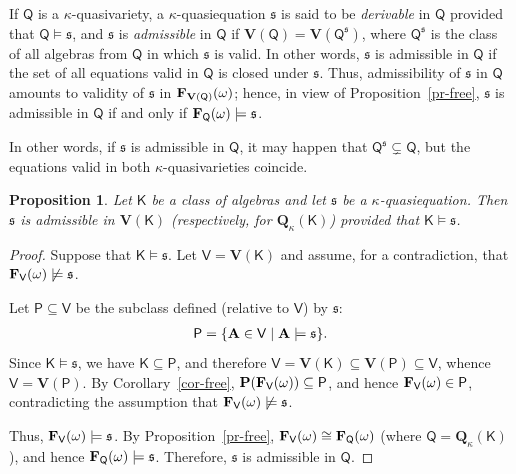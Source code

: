 \documentclass[submission,copyright,creativecommons]{eptcs}
\newtheorem{prop}[theorem]{Proposition}
\theoremstyle{definition}
\newcommand{\alg}[1]{{{\textbf{\upshape #1}}}}
\newcommand{\VV}{\mathbf{V}}
\newcommand{\QQ}{\mathbf{Q}}
\newcommand{\PR}{\mathbf{P}}
\newcommand{\vv}[1]{\mathsf {#1}}
\newcommand{\FrV}{\alg F_\vv V(\omega)}
\newcommand{\Def}[1]{\textit{#1}}
\newcommand{\seq}[2]{#1 \Ra  {#2}}
\newcommand{\GG}{\Gamma}
\newcommand{\gm}{\gamma}
\newcommand{\kk}{\kappa}
\newcommand{\Ra}{\Rightarrow}
\newcommand{\sq}{\mathfrak{s}}
\begin{document}
If $\vv Q$ is a $\kk$-quasivariety, a $\kk$-quasiequation $\sq$ is said to be \Def{derivable} in $\vv Q$ provided that $\vv Q \models \sq$, and $\sq$ is \Def{admissible} in $\vv Q$ if $\VV(\vv Q) = \VV(\vv Q^\sq)$, where $\vv Q^\sq$ is the class of all algebras from $\vv Q$ in which $\sq$ is valid. In other words, $\sq$ is admissible in $\vv Q$ if the set of all equations valid in $\vv Q$ is closed under $\sq$. Thus, admissibility of $\sq$ in $\vv Q$ amounts to validity of $\sq$ in $\alg F_{\VV(\vv Q)}(\omega)$; hence, in view of Proposition~\ref{pr-free}, $\sq$ is admissible in $\vv Q$ if and only if $\alg F_\vv Q(\omega) \models \sq$.

In other words, if $\sq$ is admissible in $\vv Q$, it may happen that $\vv Q^\sq \subsetneq \vv Q$, but the equations valid in both $\kk$-quasivarieties coincide.


\begin{prop}\label{pr-adm}
	Let $\vv K$ be a class of algebras and let $\sq$ be a $\kk$-quasiequation. Then $\sq$ is admissible in $\VV(\vv K)$ (respectively, for $\QQ_\kk(\vv K)$) provided that $\vv K \models \sq$.
\end{prop}

\begin{proof}
	Suppose that $\vv K \models \sq$. Let $\vv V = \VV(\vv K)$ and assume, for a contradiction, that $\FrV \not\models \sq$.
	
	Let $\vv P \subseteq \vv V$ be the subclass defined (relative to $\vv V$) by $\sq$:
	\begin{align*}
		\vv P = \{ \alg A \in \vv V \mid \alg A \models \sq \}.
	\end{align*}
	Since $\vv K \models \sq$, we have $\vv K \subseteq \vv P$, and therefore $\vv V = \VV(\vv K) \subseteq \VV(\vv P) \subseteq \vv V$, whence $\vv V = \VV(\vv P)$. By Corollary~\ref{cor-free}, $\PR(\FrV) \subseteq \vv P$, and hence $\FrV \in \vv P$, contradicting the assumption that $\FrV \not\models \sq$.
	
	Thus, $\FrV \models \sq$. By Proposition~\ref{pr-free}, $\FrV \cong \alg F_{\vv Q}(\omega)$ (where $\vv Q = \QQ_\kk(\vv K)$), and hence $\alg F_{\vv Q}(\omega) \models \sq$. Therefore, $\sq$ is admissible in $\vv Q$.
\end{proof}
\end{document}
